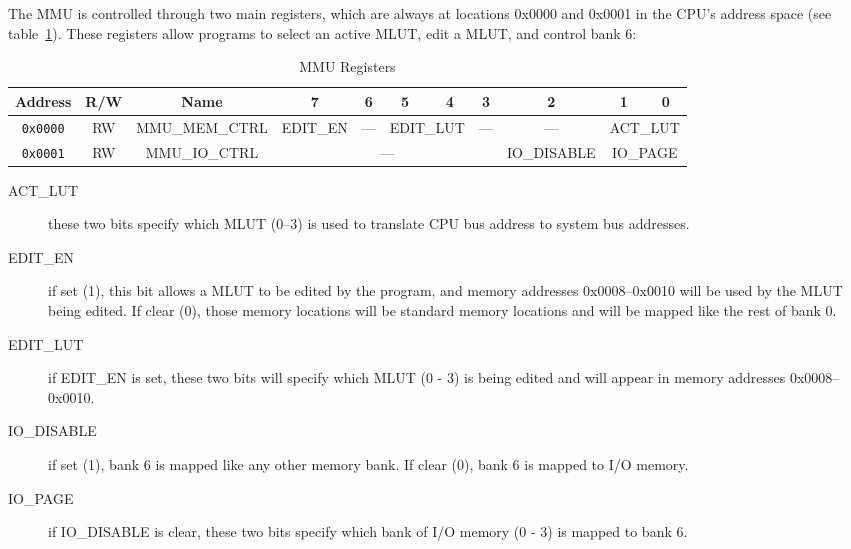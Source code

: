 The MMU is controlled through two main registers, which are always at locations 0x0000 and 0x0001 in the CPU's address space (see table~\ref{tab:mmu_registers}). These registers allow programs to select an active MLUT, edit a MLUT, and control bank 6:

\begin{table}[ht]
	\begin{center}
		\begin{tabular}{| c | c | c || c | c | c | c | c | c | c | c |} \hline
			Address & R/W & Name & 7 & 6 & 5 & 4 & 3 & 2 & 1 & 0 \\ \hline\hline
			\verb+0x0000+ & RW & MMU\_MEM\_CTRL & EDIT\_EN & --- & \multicolumn{2}{|c|}{EDIT\_LUT} & --- & --- & \multicolumn{2}{|c|}{ACT\_LUT} \\ \hline
			\verb+0x0001+ & RW & MMU\_IO\_CTRL & \multicolumn{5}{|c|}{---} & IO\_DISABLE & \multicolumn{2}{|c|}{IO\_PAGE} \\ \hline
		\end{tabular}
	\end{center}
	\caption{MMU Registers}
	\label{tab:mmu_registers}
\end{table}

\begin{description}
	\item[ACT\_LUT] these two bits specify which MLUT (0--3) is used to translate CPU bus address to system bus addresses.

	\item[EDIT\_EN] if set (1), this bit allows a MLUT to be edited by the program, and memory addresses 0x0008--0x0010 will be used by the MLUT being edited. If clear (0), those memory locations will be standard memory locations and will be mapped like the rest of bank 0.

	\item[EDIT\_LUT] if EDIT\_EN is set, these two bits will specify which MLUT (0 - 3) is being edited and will appear in memory addresses 0x0008--0x0010.

	\item[IO\_DISABLE] if set (1), bank 6 is mapped like any other memory bank. If clear (0), bank 6 is mapped to I/O memory.

	\item[IO\_PAGE] if IO\_DISABLE is clear, these two bits specify which bank of I/O memory (0 - 3) is mapped to bank 6.
\end{description}


